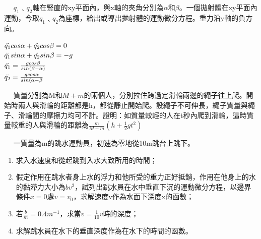 \documentclass[cn,10pt,math=newtx,chinesefont=founder]{../elegantbook}
\begin{document}
\newpage


\begin{example}　
    $q_1$﹑$q_2$軸在豎直的xy平面內，與x軸的夾角分別為$\alpha$和$\beta$。一個拋射體在xy平面內運動，今取$q_1$﹑$q_2$為座標，給出或導出拋射體的運動微分方程。重力沿y軸的負方向。
    
    \rightline{[2.1.27]}
    
\end{example}

\begin{solution}
$\Ddot{q_1}cos\alpha + \Ddot{q_2}cos\beta = 0$\\
$\Ddot{q_1}sin\alpha + \Ddot{q_2}sin\beta = -g$\\
$\Ddot{q_1} = \frac{gcos\beta}{sin(\beta-\alpha)}$\\
$\Ddot{q_2} = \frac{gcos\alpha}{sin(\alpha-\beta}$
\end{solution}

\newpage


\begin{example}　
    質量分別為M和$M+m$的兩個人，分別拉住跨過定滑輪兩邊的繩子往上爬。開始時兩人與滑輪的距離都是h，都從靜止開始爬。設繩子不可伸長，繩子質量與繩子、滑輪間的摩擦力均可不計。證明：如質量較輕的人在t秒內爬到滑輪，這時質量較重的人與滑輪的距離為$\frac{m}{M+m}(h+\frac{1}{2}gt^2)$
    
    \rightline{[2.1.28]}
    
\end{example}

\begin{solution}

\end{solution}

\newpage


\begin{example}　
    一質量為m的跳水運動員，初速為零地從10m跳台上跳下。
    \begin{enumerate}[label=(\arabic*)]
    \item 求入水速度和從起跳到入水大致所用的時間；
    \item 假定作用在跳水者身上水的浮力和他所受的重力正好抵銷，作用在他身上的水的黏滯力大小為$bv^2$，試列出跳水員在水中垂直下沉的運動微分方程，以邊界條件$x=0$處$v=v_0$，求解速度v作為水面下深度x的函數；
    \item 若$\frac{b}{m} = 0.4m^{-1}$，求當$v = \frac{1}{10}v$時的深度；
    \item 求解跳水員在水下的垂直深度作為在水下的時間的函數。
    \end{enumerate}
    
    \rightline{[2.1.29]}
    
\end{example}
\end{document}

